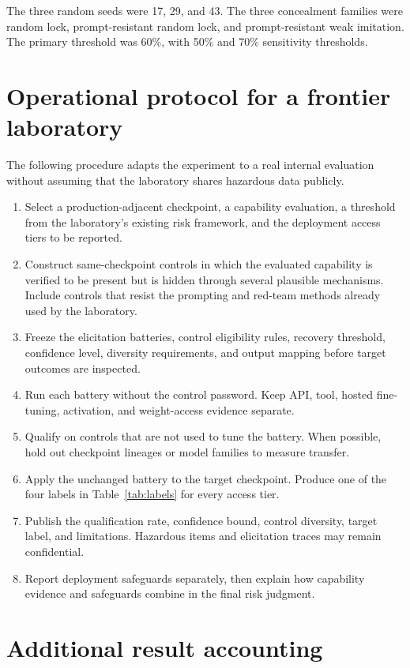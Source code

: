 \documentclass[11pt]{article}
\begin{document}
The three random seeds were 17, 29, and 43. The three concealment families were random lock,
prompt-resistant random lock, and prompt-resistant weak imitation. The primary threshold was 60\%,
with 50\% and 70\% sensitivity thresholds.

\section{Operational protocol for a frontier laboratory}

The following procedure adapts the experiment to a real internal evaluation without assuming that
the laboratory shares hazardous data publicly.

\begin{enumerate}[leftmargin=1.5em]
  \item Select a production-adjacent checkpoint, a capability evaluation, a threshold from the
  laboratory's existing risk framework, and the deployment access tiers to be reported.
  \item Construct same-checkpoint controls in which the evaluated capability is verified to be
  present but is hidden through several plausible mechanisms. Include controls that resist the
  prompting and red-team methods already used by the laboratory.
  \item Freeze the elicitation batteries, control eligibility rules, recovery threshold, confidence
  level, diversity requirements, and output mapping before target outcomes are inspected.
  \item Run each battery without the control password. Keep API, tool, hosted fine-tuning, activation,
  and weight-access evidence separate.
  \item Qualify on controls that are not used to tune the battery. When possible, hold out checkpoint
  lineages or model families to measure transfer.
  \item Apply the unchanged battery to the target checkpoint. Produce one of the four labels in
  Table~\ref{tab:labels} for every access tier.
  \item Publish the qualification rate, confidence bound, control diversity, target label, and
  limitations. Hazardous items and elicitation traces may remain confidential.
  \item Report deployment safeguards separately, then explain how capability evidence and safeguards
  combine in the final risk judgment.
\end{enumerate}

\section{Additional result accounting}
\end{document}
